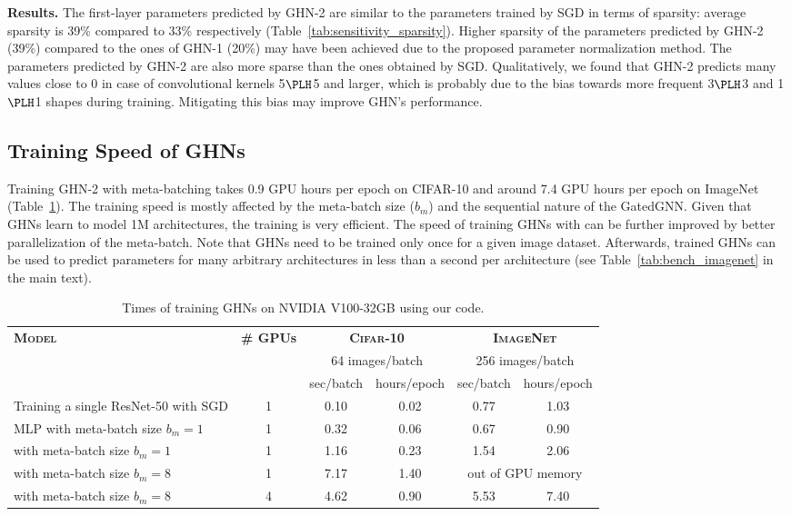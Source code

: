 \textbf{Results.} The first-layer parameters predicted by GHN-2 are similar to the parameters trained by SGD in terms of sparsity: average sparsity is 39\% compared to 33\% respectively (Table~\ref{tab:sensitivity_sparsity}). Higher sparsity of the parameters predicted by GHN-2 (39\%) compared to the ones of GHN-1 (20\%) may have been achieved due to the proposed parameter normalization method. The parameters predicted by GHN-2 are also more sparse than the ones obtained by SGD. Qualitatively, we found that GHN-2 predicts many values close to 0 in case of convolutional kernels 5$\PLH$5 and larger, which is probably due to the bias towards more frequent 3$\PLH$3 and 1$\PLH$1 shapes during training. Mitigating this bias may improve GHN’s performance.

\subsection{Training Speed of GHNs}
Training GHN-2 with meta-batching takes 0.9 GPU hours per epoch on CIFAR-10 and around 7.4 GPU hours per epoch on ImageNet (Table~\ref{tab:cost}). The training speed is mostly affected by the meta-batch size ($b_m$) and the sequential nature of the GatedGNN. Given that GHNs learn to model 1M architectures, the training is very efficient. The speed of training GHNs with  can be further improved by better parallelization of the meta-batch. Note that GHNs need to be trained only once for a given image dataset. Afterwards, trained GHNs can be used to predict parameters for many arbitrary architectures in less than a second per architecture (see Table~\ref{tab:bench_imagenet} in the main text).

\begin{table}[tbhp]
	\caption{Times of training GHNs on NVIDIA V100-32GB using our code.}
	\label{tab:cost}
	\vspace{3pt}
	\small
	\centering
	\begin{tabular}{lccccc}
		\toprule
		\textbf{\textsc{Model}} & \textbf{\# GPUs} & \multicolumn{2}{c}{\textbf{\textsc{Cifar-10}}} &	\multicolumn{2}{c}{\textbf{\textsc{ImageNet}}} \\
		& & \multicolumn{2}{c}{64 images/batch} &	\multicolumn{2}{c}{256 images/batch}\Bstrut\\
		\midrule
		& & sec/batch & hours/epoch & sec/batch & hours/epoch \\
		Training a single ResNet-50 with SGD & 1 & 0.10  & 0.02 & 0.77 & 1.03\Bstrut\\
		MLP with meta-batch size $b_m=1$ & 1 & 0.32 & 0.06 & 0.67 & 0.90 \\
		\ghnours with meta-batch size $b_m=1$ &	1 & 1.16 & 0.23 & 1.54 & 2.06 \\
		\ghnours with meta-batch size $b_m=8$ & 1 & 7.17 & 1.40 & \multicolumn{2}{c}{out of GPU memory} \\
		\ghnours with meta-batch size $b_m=8$ & 4 &	4.62 & 0.90 & 5.53 & 7.40 \\
		\bottomrule
	\end{tabular}
\end{table}



